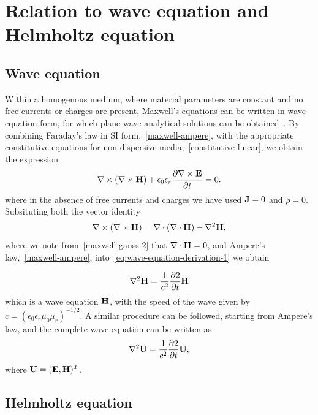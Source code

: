 \section{Relation to wave equation and Helmholtz equation}
%
\subsection{Wave equation}

Within a homogenous medium, where material parameters are constant and no free currents or charges are present, Maxwell's equations can be written in wave equation form, for which plane wave analytical solutions can be obtained~\cite{Jackson:490457}. By combining Faraday's law in SI form,~\eqref{maxwell-ampere}, with the appropriate constitutive equations for non-dispersive media,~\eqref{constitutive-linear}, we obtain the expression
\begin{equation}
\label{eq:wave-equation-derivation-1}
\nabla \times ( \nabla \times \mathbf{H} ) + \epsilon_0 \epsilon_r \frac{\partial  \nabla \times \mathbf{E} }{\partial t} = 0 .
\end{equation}
where in the absence of free currents and charges we have used $\mathbf{J} = 0$ and $\rho = 0$.
Subsituting both the vector identity
$$
\nabla \times ( \nabla \times \mathbf{H} ) = \nabla \cdot ( \nabla \cdot \mathbf{H} ) - \nabla^2 \mathbf{H},
$$
where we note from~\eqref{maxwell-gauss-2} that $\nabla \cdot \mathbf{H} = 0$, and Ampere's law,~\eqref{maxwell-ampere}, into~\eqref{eq:wave-equation-derivation-1} we obtain

\begin{equation}
\label{maxwell-wave-eqtn-E}
    \nabla^2 \mathbf{H} = \frac{1}{c^2} \frac{\partial 2}{\partial t}{ \mathbf{H} }
\end{equation}
which is a wave equation $\mathbf{H}$, with the speed of the wave given by $c = (\epsilon_0 \epsilon_r \mu_0 \mu_r )^{-1/2}$. A similar procedure can be followed, starting from Ampere's law, and the complete wave equation can be written as
\begin{equation}
\label{maxwell-wave-eqtn-E}
    \nabla^2 \mathbf{U} = \frac{1}{c^2} \frac{\partial 2}{\partial t}{ \mathbf{U} } ,
\end{equation}
where $\mathbf{U} = ( \mathbf{E}, \mathbf{H} )^T$.


\subsection{Helmholtz equation}


